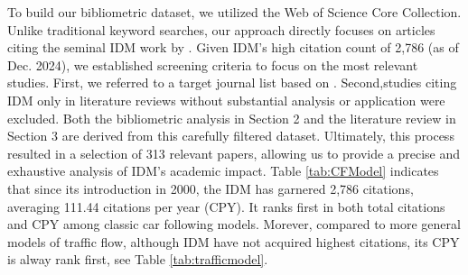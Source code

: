 \documentclass[a4paper,fleqn]{cas-sc}
\begin{document}
To build our bibliometric dataset, we utilized the Web of Science Core Collection. Unlike traditional keyword searches, our approach directly focuses on articles citing the seminal IDM work by \cite{treiberCongestedTrafficStatesEmpirical2000}. Given IDM’s high citation count of 2,786 (as of Dec. 2024), we established screening criteria to focus on the most relevant studies. First, we referred to a target journal list based on \cite{punzoCalibrationCarFollowingDynamicsAutomated2021c}. Second,studies citing IDM only in literature reviews without substantial analysis or application were excluded. Both the bibliometric analysis in Section 2 and the literature review in Section 3 are derived from this carefully filtered dataset. Ultimately, this process resulted in a selection of 313 relevant papers, allowing us to provide a precise and exhaustive analysis of IDM's academic impact. Table \ref{tab:CFModel} indicates that since its introduction in 2000, the IDM has garnered 2,786 citations, averaging 111.44 citations per year (CPY). It ranks first in both total citations and CPY among classic car following models. Morever, compared to more general models of traffic flow, although IDM have not acquired highest citations, its CPY is alway rank first, see Table \ref{tab:trafficmodel}.
\end{document}

